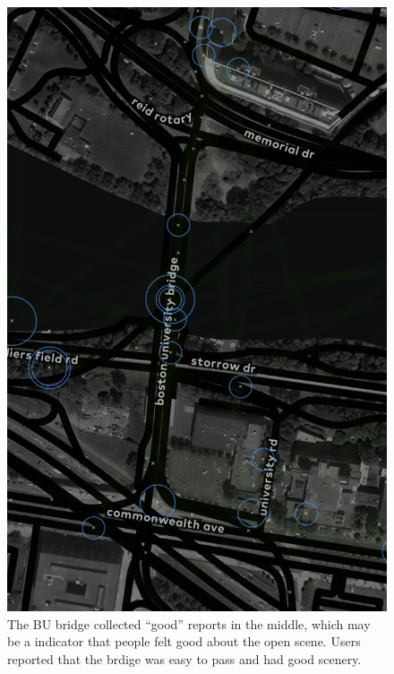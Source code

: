 \begin{figure}[!htb]
  \includegraphics{appendix/G/fig/good_bu.png}               
  \caption[``good'' reports in BU bridge]{The BU bridge collected ``good'' reports in the middle, which may be a indicator that people felt good about the open scene. Users reported that the brdige was easy to pass and had good scenery.}
  \label{fig:good_bu}
\end{figure}

